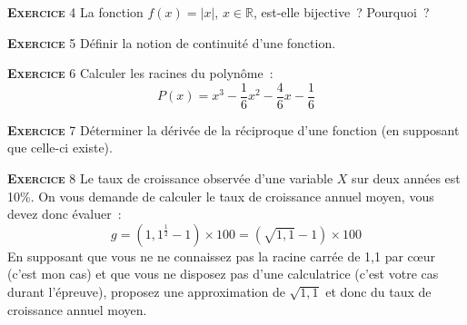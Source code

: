 \documentclass[10pt,a4paper,notitlepage]{article}
\newcommand{\exercice}[1]{\textsc{\textbf{Exercice}} #1}
\begin{document}
\exercice{4} La fonction $f(x) = |x|$, $x\in\mathbb R$, est-elle bijective ? Pourquoi ?

\bigskip

\exercice{5} Définir la notion de continuité d'une fonction. 

\bigskip

\exercice{6} Calculer les racines du polynôme :
\[
P(x) = x^3 - \frac{1}{6}x^2 - \frac{4}{6}x - \frac{1}{6}
\]    

\bigskip

\exercice{7} Déterminer la dérivée de la réciproque d'une fonction (en supposant que celle-ci existe).

\bigskip

\exercice{8} Le taux de croissance observée d'une variable $X$ sur deux années est 10\%. On vous demande de calculer le taux de croissance annuel moyen, vous devez donc évaluer :
\[
g = (1,1^{\frac{1}{2}}-1)\times 100 = \left(\sqrt{1,1}-1\right)\times 100
\]
En supposant que vous ne ne connaissez pas la racine carrée de 1,1 par c\oe ur (c'est mon cas) et que vous ne disposez pas d'une calculatrice (c'est votre cas durant l'épreuve), proposez une approximation de $\sqrt{1,1}$ et donc du taux de croissance annuel moyen.
 
\end{document}
